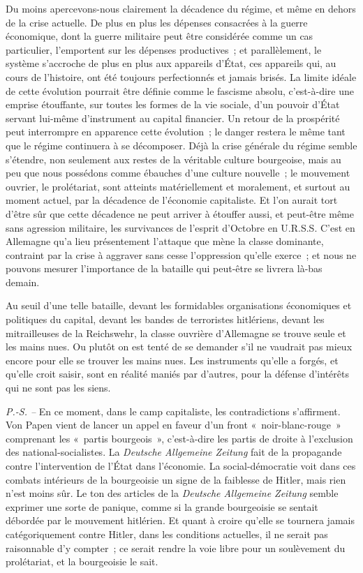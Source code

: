 \documentclass[french,twoside]{book} %
\begin{document}
Du moins apercevons-nous clairement la décadence du régime, et même en dehors de la crise actuelle. De plus en plus les dépenses consacrées à la guerre économique, dont la guerre militaire peut être considérée comme un cas particulier, l'emportent sur les dépenses productives ; et parallèlement, le système s'accroche de plus en plus aux appareils d'État, ces appareils qui, au cours de l'histoire, ont été toujours perfectionnés et jamais brisés. La limite idéale de cette évolution pourrait être définie comme le fascisme absolu, c'est-à-dire une emprise étouffante, sur toutes les formes de la vie sociale, d'un pouvoir d'État servant lui-même d'instrument au capital financier. Un retour de la prospérité peut interrompre en apparence cette évolution ; le danger restera le même tant que le régime continuera à se décomposer. Déjà la crise générale du régime semble s'étendre, non seulement aux restes de la véritable culture bourgeoise, mais au peu que nous possédons comme ébauches d'une culture nouvelle ; le mouvement ouvrier, le prolétariat, sont atteints matériel­lement et moralement, et surtout au moment actuel, par la décadence de l'économie capitaliste. Et l'on aurait tort d'être sûr que cette décadence ne peut arriver à étouffer aussi, et peut-être même sans agression militaire, les survivances de l'esprit d'Octobre en U.R.S.S. C'est en Allemagne qu'a lieu présentement l'attaque que mène la classe dominante, contraint par la crise à aggraver sans cesse l'oppression qu'elle exerce ; et nous ne pouvons mesurer l'importance de la bataille qui peut-être se livrera là-bas demain.\par
Au seuil d'une telle bataille, devant les formidables organisations écono­miques et politiques du capital, devant les bandes de terroristes hitlériens, devant les mitrailleuses de la Reichswehr, la classe ouvrière d'Allemagne se trouve seule et les mains nues. Ou plutôt on est tenté de se demander s'il ne vaudrait pas mieux encore pour elle se trouver les mains nues. Les instruments qu'elle a forgés, et qu'elle croit saisir, sont en réalité maniés par d'autres, pour la défense d'intérêts qui ne sont pas les siens.\par
{\itshape P.-S. –} En ce moment, dans le camp capitaliste, les contradictions s'affir­ment. Von Papen vient de lancer un appel en faveur d'un front « noir-blanc-rouge » comprenant les « partis bourgeois », c'est-à-dire les partis de droite à l'exclusion des national-socialistes. La {\itshape Deutsche Allgemeine Zeitung} fait de la propagande contre l'intervention de l'État dans l'économie. La social-démo­cratie voit dans ces combats intérieurs de la bourgeoisie un signe de la fai­blesse de Hitler, mais rien n'est moins sûr. Le ton des articles de la {\itshape Deutsche Allgemeine Zeitung} semble exprimer une sorte de panique, comme si la grande bourgeoisie se sentait débordée par le mouvement hitlérien. Et quant à croire qu'elle se tournera jamais catégoriquement contre Hitler, dans les conditions actuelles, il ne serait pas raisonnable d'y compter ; ce serait rendre la voie libre pour un soulèvement du prolétariat, et la bourgeoisie le sait.\par
\end{document}
